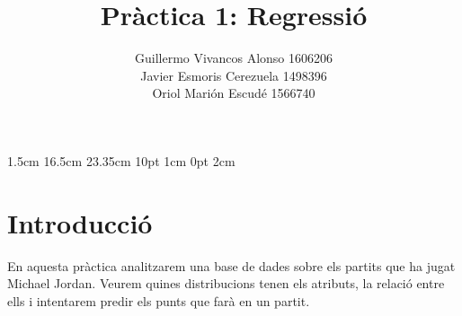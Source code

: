 \documentclass{article}
\title{Pràctica 1: Regressió}
\author{Guillermo Vivancos Alonso 1606206\\
	Javier Esmoris Cerezuela 1498396\\
	Oriol Marión Escudé 1566740}
\begin{document}
\date{}
\setmargins{2.5cm}       %
{1.5cm}                        %
{16.5cm}                      %
{23.35cm}                    %
{10pt}                           %
{1cm}                           %
{0pt}                             %
{2cm}                           %

\pagestyle{fancy}
\fancyhf{}
\rfoot{\thepage}
\maketitle
\noindent
\section*{Introducció}
En aquesta pràctica analitzarem una base de dades sobre els partits que ha jugat Michael Jordan. Veurem quines distribucions tenen els atributs, la relació entre ells i intentarem predir els punts que farà en un partit.
\end{document}
